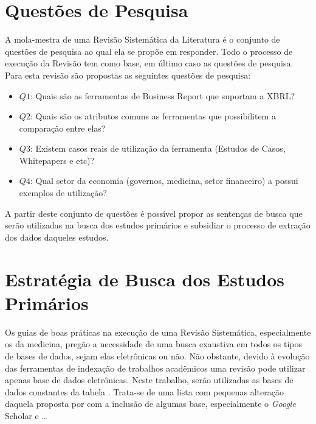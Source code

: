 \documentclass{article}
\begin{document}
\section{Questões de Pesquisa}
\label{sec:questoes_pesquisa}

A mola-mestra de uma Revisão Sistemática da Literatura é o conjunto de questões de pesquisa ao qual ela se propõe em responder. Todo o processo de execução da Revisão tem como base, em último caso as questões de pesquisa. Para esta revisão são propostas as seguintes questões de pesquisa:

\begin{itemize}
  \item \textbf{$Q1$}: Quais são as ferramentas de Business Report que
    suportam a XBRL?
  \item \textbf{$Q2$}: Quais são os atributos comuns as ferramentas
    que possibilitem a comparação entre elas?
  \item \textbf{$Q3$}: Existem casos reais de utilização da ferramenta
    (Estudos de Casos, Whitepapers e etc)?
  \item \textbf{$Q4$}: Qual setor da economia (governos, medicina, setor financeiro) a
    possui exemplos de utilização?
\end{itemize}

A partir deste conjunto de questões é possível propor as sentenças de busca que serão utilizadas na busca dos estudos primários e subsidiar o processo de extração dos dados daqueles estudos.

\section{Estratégia de Busca dos Estudos Primários}
\label{sec:busca_estudos}

Os guias de boas práticas na execução de uma Revisão Sistemática, especialmente os da medicina, pregão a necessidade de uma busca exaustiva em todos os tipos de bases de dados, sejam elas eletrônicas ou não. Não obstante, devido à evolução das ferramentas de indexação de trabalhos acadêmicos uma revisão pode utilizar apenas base de dados eletrônicas. Neste trabalho, serão utilizadas as bases de dados constantes da tabela . Trata-se de uma lista com pequenas alteração daquela proposta por \cite{Brereton2007571} com a inclusão de algumas base, especialmente o \textit{Google} Scholar e \ldots
\end{document}
